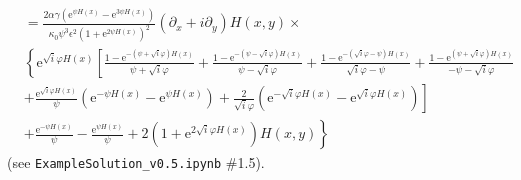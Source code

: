 \documentclass[10pt]{amsart}
\begin{document}
\begin{align}
& =
\frac{ 2 \alpha  \gamma\left(\mathrm{e}^{\psi H(x)} -  \mathrm{e}^{3 \psi H(x)}  \right)}{\kappa_0  \psi^{3} \epsilon^{2} \left( 1 + \mathrm{e}^{2 \psi H(x)} \right)^{2}}
\left( \partial_x + i \partial_y \right) H(x,y) \times \nonumber \\
&\left\{
   \mathrm{e}^{\sqrt{i} \varphi H(x) } 
   \left[
   \frac{1 - \mathrm{e}^{-\left( \psi + \sqrt{i} \varphi \right) H(x)}}{\psi + \sqrt{i} \varphi}
+ \frac{1 - \mathrm{e}^{-\left( \psi - \sqrt{i} \varphi \right) H(x)}}{\psi - \sqrt{i} \varphi}
+ \frac{1 - \mathrm{e}^{-\left( \sqrt{i} \varphi - \psi \right) H(x)}}{\sqrt{i} \varphi - \psi}
+ \frac{1 - \mathrm{e}^{  \left( \psi + \sqrt{i} \varphi \right) H(x)}}{-\psi - \sqrt{i} \varphi}
\right.\right. \nonumber \\ 
& \left.\left.
+ \frac{\mathrm{e}^{\sqrt{i} \varphi H(x)}}{\psi} \left(      \mathrm{e}^{- \psi H(x) }
-  \mathrm{e}^{  \psi H(x) } \right)
+ \frac{2}{\sqrt{i} \varphi} \left( \mathrm{e}^{- \sqrt{i} \varphi H(x) }
-   \mathrm{e}^{ \sqrt{i} \varphi H(x)} \right)
\right] \right. \nonumber \\
& \left.
+ \frac{  \mathrm{e}^{-\psi H(x)}}{\psi}
- \frac{  \mathrm{e}^{ \psi H(x)}}{\psi}
+ 2 \left( 1 +  \mathrm{e}^{2 \sqrt{i} \varphi H(x)}\right) H(x,y)
\right\}
\end{align}
(see \texttt{ExampleSolution\_v0.5.ipynb} \#1.5).






\end{document}
